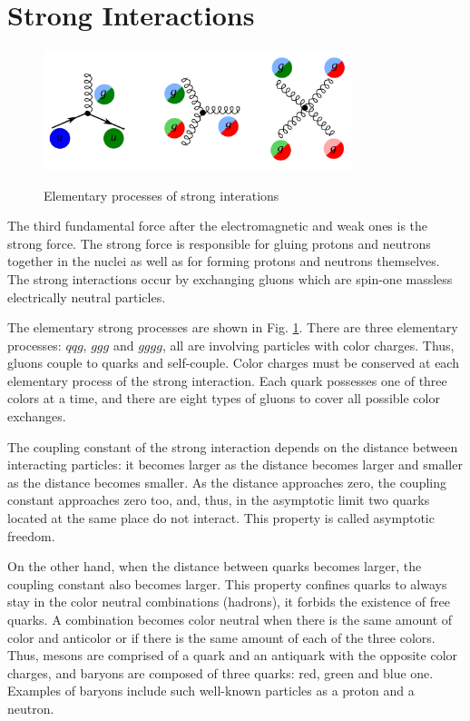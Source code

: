 \section{Strong Interactions}
\label{sec:Intro_QCD}

\begin{figure}[htb]
  \begin{center}
    {\includegraphics[width=0.80\textwidth]{../figs/Intro/feynmStrong.png}}
    \caption{Elementary processes of strong interations}
    \label{fig:feynmStrong}
  \end{center}
\end{figure}

The third fundamental force after the electromagnetic and weak ones is the strong force. The strong force is responsible for gluing protons and neutrons together in the nuclei as well as for forming protons and neutrons themselves. The strong interactions occur by exchanging gluons which are spin-one massless electrically neutral particles.  

The elementary strong processes are shown in Fig. \ref{fig:feynmStrong}. There are three elementary processes: $qqg$, $ggg$ and $gggg$, all are involving particles with color charges. Thus, gluons couple to quarks and self-couple. Color charges must be conserved at each elementary process of the strong interaction. Each quark possesses one of three colors at a time, and there are eight types of gluons to cover all possible color exchanges. 

The coupling constant of the strong interaction depends on the distance between interacting particles: it becomes larger as the distance becomes larger and smaller as the distance becomes smaller. As the distance approaches zero, the coupling constant approaches zero too, and, thus, in the asymptotic limit two quarks located at the same place do not interact. This property is called asymptotic freedom.

On the other hand, when the distance between quarks becomes larger, the coupling constant also becomes larger. This property confines quarks to always stay in the color neutral combinations (hadrons), it forbids the existence of free quarks. A combination becomes color neutral when there is the same amount of color and anticolor or if there is the same amount of each of the three colors.  Thus, mesons are comprised of a quark and an antiquark with the opposite color charges, and baryons are composed of three quarks: red, green and blue one. Examples of baryons include such well-known particles as a proton and a neutron.


